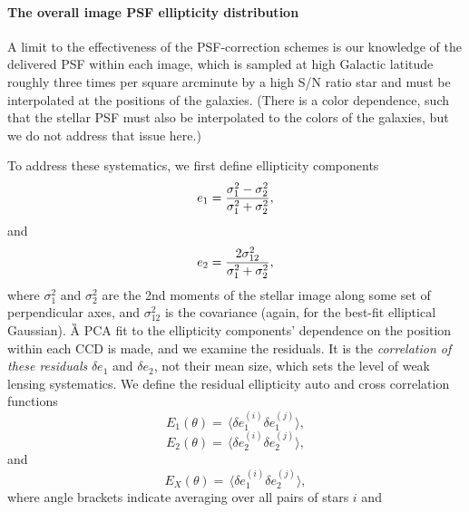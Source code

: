 

\paragraph{The overall image PSF ellipticity distribution\\}
\label{sec:fullEllip}

A limit to the effectiveness of the PSF-correction schemes is our
knowledge of the delivered PSF within each image, which is sampled
at high Galactic latitude roughly three times per square arcminute by a
high S/N ratio star and must be interpolated at the positions of the
galaxies. (There is a color dependence, such that the stellar PSF must
also be interpolated to the colors of the galaxies, but we do not
address that issue here.)

To address these systematics, we first define ellipticity components
\begin{equation}
 e_1 = {\sigma_1^2 - \sigma_2^2 \over \sigma_1^2 + \sigma_2^2},
\end{equation}
and
\begin{equation}
 e_2 = {2 \sigma_{12}^2 \over \sigma_1^2 + \sigma_2^2},
\end{equation}
where $\sigma_1^2$ and $\sigma_2^2$ are the 2nd moments of the stellar
image along some set of perpendicular axes, and $\sigma_{12}^2$ is the
covariance (again, for the best-fit elliptical Gaussian).  
\G{A PCA fit to the ellipticity components’ dependence on the position within
each CCD is made, and we examine the residuals.}
It is the {\it correlation of these residuals} $\delta e_1$
and $\delta e_2$, not their
mean size, which sets the level of weak lensing systematics.  We
define the residual ellipticity auto and cross correlation functions
\begin{equation}
 E_1(\theta) = \, \langle \delta e_1^{(i)}\delta e_1^{(j)} \rangle,
\end{equation}
\begin{equation}
 E_2(\theta) = \, \langle \delta e_2^{(i)}\delta e_2^{(j)} \rangle,
\end{equation}
and
\begin{equation}
 E_X(\theta) = \, \langle \delta e_1^{(i)}\delta e_2^{(j)} \rangle,
\end{equation}
where angle brackets indicate averaging over all pairs of stars $i$ and
